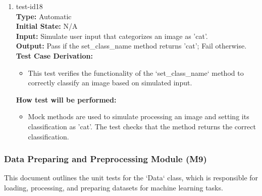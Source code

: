 \documentclass[12pt, titlepage]{article}
\begin{document}
\begin{enumerate}
\item{test-id18\\}
\textbf{Type:} Automatic\\
\textbf{Initial State:} N/A\\
\textbf{Input:} Simulate user input that categorizes an image as 'cat'.\\
\textbf{Output:} Pass if the set\_class\_name method returns 'cat'; Fail otherwise.\\
\textbf{Test Case Derivation:}
\begin{itemize}
    \item This test verifies the functionality of the `set\_class\_name` 
    method to correctly classify an image based on simulated input.
\end{itemize}
\textbf{How test will be performed:}
\begin{itemize}
    \item Mock methods are used to simulate processing an image and setting its 
    classification as 'cat'. The test checks that the method returns the correct classification.
\end{itemize}

\end{enumerate}

\subsubsection{Data Preparing and Preprocessing Module (M9)}
This document outlines the unit tests for the `Data` class, which is responsible 
for loading, processing, and preparing datasets for machine learning tasks.
\end{document}
